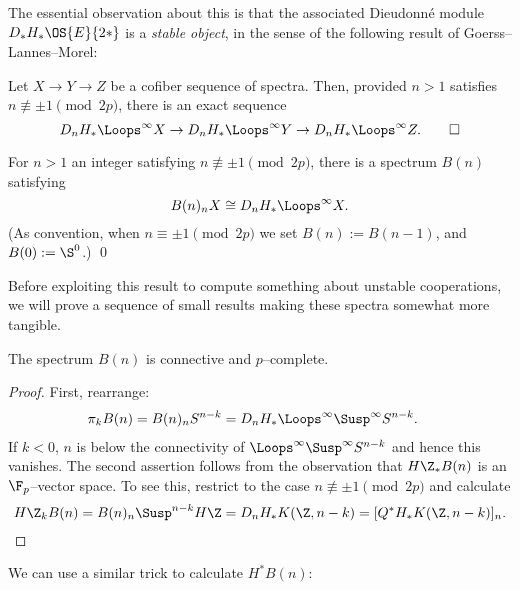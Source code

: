 \noindent The essential observation about this is that the associated Dieudonn\'e module $D_* H_* \OS{E}{2*}$ is a \emph{stable object}, in the sense of the following result of Goerss--Lannes--Morel:

\begin{theorem}
Let $X \to Y \to Z$ be a cofiber sequence of spectra.  Then, provided $n > 1$ satisfies $n \not\equiv \pm 1 \pmod{2p}$, there is an exact sequence \[D_n H_* \Loops^\infty X \to D_n H_* \Loops^\infty Y \to D_n H_* \Loops^\infty Z. \qed\]
\end{theorem}

\begin{corollary}
For $n > 1$ an integer satisfying $n \not\equiv \pm 1 \pmod{2p}$, there is a spectrum $B(n)$ satisfying \[B(n)_n X \cong D_n H_* \Loops^\infty X.\] (As convention, when $n \equiv \pm 1 \pmod{2p}$ we set $B(n) := B(n-1)$, and $B(0) := \S^0$.)   \qed
\end{corollary}

Before exploiting this result to compute something about unstable cooperations, we will prove a sequence of small results making these spectra somewhat more tangible.

\begin{lemma}
The spectrum $B(n)$ is connective and $p$--complete.
\end{lemma}
\begin{proof}
First, rearrange:
\begin{align*}
\pi_k B(n) & = B(n)_n S^{n-k} = D_n H_* \Loops^\infty \Susp^\infty S^{n-k}.
\end{align*}
If $k < 0$, $n$ is below the connectivity of $\Loops^\infty \Susp^\infty S^{n-k}$ and hence this vanishes.  The second assertion follows from the observation that $H\Z_* B(n)$ is an $\F_p$--vector space.  To see this, restrict to the case $n \not\equiv \pm 1 \pmod{2p}$ and calculate \[H\Z_k B(n) = B(n)_n \Susp^{n-k} H\Z = D_n H_* K(\Z, n-k) = [Q^* H_* K(\Z, n-k)]_n. \qedhere\]
\end{proof}

\noindent We can use a similar trick to calculate $H^* B(n)$:

